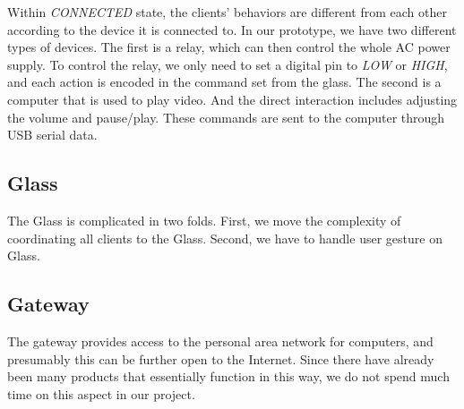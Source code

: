 Within {\it CONNECTED} state, the clients' behaviors are different from each other according to the device it is connected to. In our prototype, we have two different types of devices. The first is a relay, which can then control the whole AC power supply. To control the relay, we only need to set a digital pin to {\it LOW} or {\it HIGH}, and each action is encoded in the command set from the glass. The second is a computer that is used to play video. And the direct interaction includes adjusting the volume and pause/play. These commands are sent to the computer through USB serial data.

\subsection{Glass}
\label{sec:glass}

The Glass is complicated in two folds. First, we move the complexity of coordinating all clients to the Glass. Second, we have to handle user gesture on Glass. 


\subsection{Gateway}
\label{sec:gateway}

The gateway provides access to the personal area network for computers, and presumably this can be further open to the Internet. Since there have already been many products \cite{NinjaBlocks, Lockitron} that essentially function in this way, we do not spend much time on this aspect in our project. 



